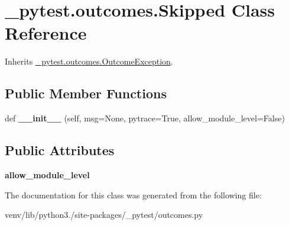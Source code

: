 \hypertarget{class__pytest_1_1outcomes_1_1_skipped}{}\section{\+\_\+pytest.\+outcomes.\+Skipped Class Reference}
\label{class__pytest_1_1outcomes_1_1_skipped}


Inherits \hyperlink{class__pytest_1_1outcomes_1_1_outcome_exception}{\+\_\+pytest.\+outcomes.\+Outcome\+Exception}.

\subsection*{Public Member Functions}
\begin{DoxyCompactItemize}
\item 
\mbox{\label{class__pytest_1_1outcomes_1_1_skipped_a48586936a4ff46bee538e6cf39d9409e}} 
def {\bfseries \+\_\+\+\_\+init\+\_\+\+\_\+} (self, msg=None, pytrace=True, allow\+\_\+module\+\_\+level=False)
\end{DoxyCompactItemize}
\subsection*{Public Attributes}
\begin{DoxyCompactItemize}
\item 
\mbox{\label{class__pytest_1_1outcomes_1_1_skipped_acd10de2ef701f2a35cf00387f5640673}} 
{\bfseries allow\+\_\+module\+\_\+level}
\end{DoxyCompactItemize}


The documentation for this class was generated from the following file\+:\begin{DoxyCompactItemize}
\item 
venv/lib/python3./site-\/packages/\+\_\+pytest/outcomes.\+py\end{DoxyCompactItemize}
